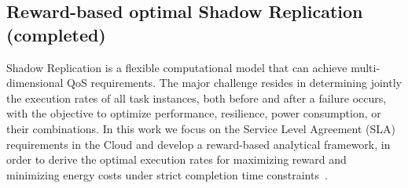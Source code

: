 


\subsection{Reward-based optimal Shadow Replication (completed)}
Shadow Replication is a flexible computational model that can achieve multi-dimensional QoS requirements. 
The major challenge resides in determining jointly the execution rates of all task instances, 
both before and after a failure occurs, with the objective to optimize performance, resilience, power consumption, or their combinations.
In this work we focus on the Service Level Agreement (SLA) requirements in the Cloud and develop a reward-based analytical framework, in order to derive the optimal execution rates for maximizing reward and minimizing energy 
costs under strict completion time constraints~\cite{cui_2014_closer,cui_en7085151}. 

